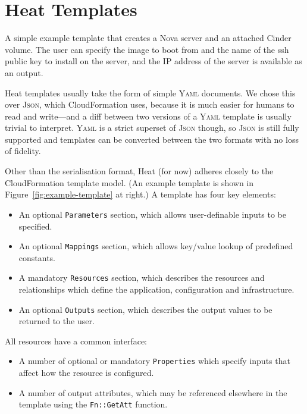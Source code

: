 \section{Heat Templates}

\begin{marginfigure}

\caption{A simple example template that creates a Nova server and an attached Cinder volume. The user can specify the image to boot from and the name of the ssh public key to install on the server, and the IP address of the server is available as an output.}
\label{fig:example-template}
\end{marginfigure}

Heat templates usually take the form of simple \textsc{Yaml} documents. We chose this over \textsc{Json}, which CloudFormation uses, because it is much easier for humans to read and write---and a diff between two versions of a \textsc{Yaml} template is usually trivial to interpret. \textsc{Yaml} is a strict superset of \textsc{Json} though, so \textsc{Json} is still fully supported and templates can be converted between the two formats with no loss of fidelity.

Other than the serialisation format, Heat (for now) adheres closely to the CloudFormation template model. (An example template is shown in Figure~\ref{fig:example-template} at right.) A template has four key elements:

\begin{itemize}
\item An optional \texttt{Parameters} section, which allows user-definable inputs to be specified.
\item An optional \texttt{Mappings} section, which allows key/value lookup of predefined constants.
\item A mandatory \texttt{Resources} section, which describes the resources and relationships which define the application, configuration and infrastructure.
\item An optional \texttt{Outputs} section, which describes the output values to be returned to the user.
\end{itemize}

All resources have a common interface:

\begin{itemize}
\item A number of optional or mandatory \texttt{Properties} which specify inputs that affect how the resource is configured.
\item A number of output attributes, which may be referenced elsewhere in the template using the \texttt{Fn::GetAtt} function.
\end{itemize}

